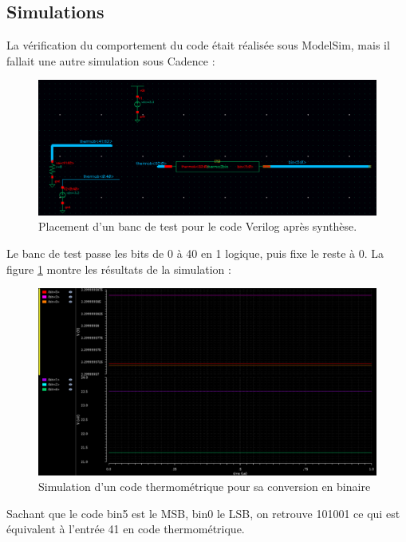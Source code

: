 \documentclass[11pt]{article}
\begin{document}
\clearpage
\subsection{Simulations}

La v\'erification du comportement du code \'etait r\'ealis\'ee sous ModelSim, mais il fallait une
autre simulation sous Cadence :

\begin{figure}[!htb]
      \centering
      \includegraphics[width=\linewidth]{test_thermo2bin.png}
      \caption{Placement d'un banc de test pour le code Verilog apr\`es synth\`ese.}
\end{figure}%

Le banc de test passe les bits de 0 \`a 40 en 1 logique, puis fixe le reste \`a 0. La figure
\ref{fig:simT2B} montre les r\'esultats de la simulation :

\begin{figure}[!htb]
      \centering
      \includegraphics[width=\linewidth]{sim_thermo2bin.png}
      \caption{Simulation d'un code thermom\'etrique pour sa conversion en binaire}
      \label{fig:simT2B}
\end{figure}%

Sachant que le code bin5 est le MSB, bin0 le LSB, on retrouve 101001 ce qui est \'equivalent \`a
l'entr\'ee 41 en code thermom\'etrique.
\end{document}
